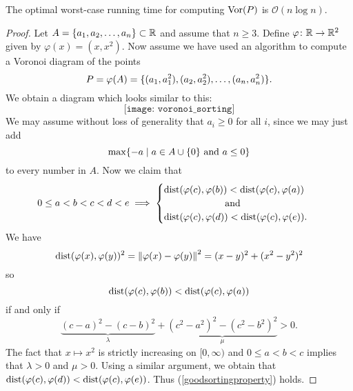 \begin{thm} \label{thm:voronoicansort}
The optimal worst-case running time for computing $\operatorname{Vor}(P)$ is $\mathcal{O}(n \log n)$.
\end{thm}
\begin{proof}
Let $A = \{a_1, a_2, \ldots, a_n\} \subset \mathbb{R}$ and assume that $n \geq 3$. Define $\varphi \colon \mathbb{R} \to \mathbb{R}^2$ given by $\varphi(x) = (x, x^2)$. Now assume we have used an algorithm to compute a Voronoi diagram of the points
\[
    P = \varphi(A) = \{(a_1, a_1^2), (a_2, a_2^2), \ldots, (a_n, a_n^2)\}.
\]
We obtain a diagram which looks similar to this:
\[
    \texttt{[image: voronoi\_sorting]}
\]
We may assume without loss of generality that $a_i \geq 0$ for all $i$, since we may just add
\[
    \max\{-a \mid a \in A \cup \{0\} \text{ and } a \leq 0\}
\]
to every number in $A$. Now we claim that
\begin{equation} \label{goodsortingproperty}
    0 \leq a < b < c < d < e
    \implies
    \begin{cases}
        \operatorname{dist}(\varphi(c), \varphi(b)) < \operatorname{dist}(\varphi(c), \varphi(a)) & \text{ } \\
        \quad\quad\quad\quad\quad\quad \text{ and } \quad & \text{ } \\
        \operatorname{dist}(\varphi(c), \varphi(d)) < \operatorname{dist}(\varphi(c), \varphi(e)). & \text{ }
    \end{cases}
\end{equation}
We have
\[
    \operatorname{dist}(\varphi(x), \varphi(y))^2 = \left\lVert \varphi(x) - \varphi(y) \right\rVert^2 = (x - y)^2 + (x^2 - y^2)^2
\]
so
\[
    \operatorname{dist}(\varphi(c), \varphi(b)) < \operatorname{dist}(\varphi(c), \varphi(a))
\]
if and only if
\[
    \underbrace{(c - a)^2 - (c - b)^2}_{\lambda} + \underbrace{(c^2 - a^2)^2 - (c^2 - b^2)^2}_{\mu} > 0.
\]
The fact that $x \mapsto x^2$ is strictly increasing on $[0, \infty)$ and $0 \leq a < b < c$ implies that $\lambda > 0$ and $\mu > 0$. Using a similar argument, we obtain that $\operatorname{dist}(\varphi(c), \varphi(d)) < \operatorname{dist}(\varphi(c), \varphi(e))$. Thus (\ref{goodsortingproperty}) holds.


\end{proof}
